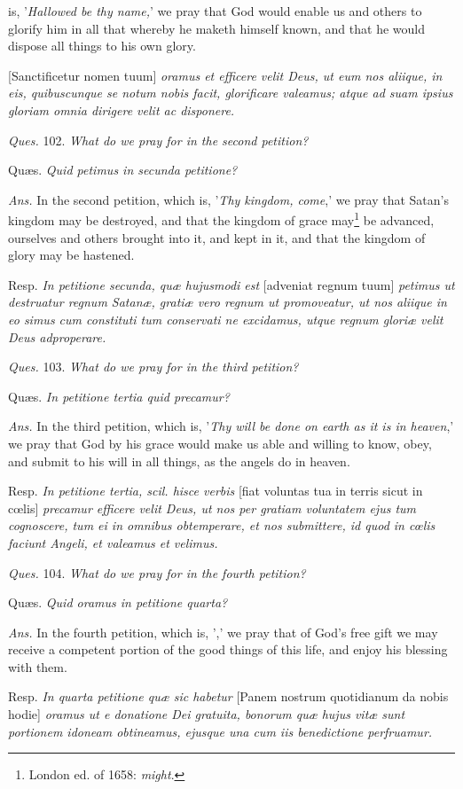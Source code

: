 is, '\emph{Hallowed be thy name,}' we pray that God would enable us and others to glorify him in all that whereby he maketh himself known, and that he would dispose all things to his own glory.

[Sanctificetur nomen tuum] \emph{oramus et efficere velit Deus, ut eum nos aliique, in eis, quibuscunque se notum nobis facit, glorificare valeamus; atque ad suam ipsius gloriam omnia dirigere velit ac disponere.}

\emph{Ques.} 102. \emph{What do we pray for in the second petition?}

Quæs. \emph{Quid petimus in secunda petitione?}

\emph{Ans.} In the second petition, which is, '\emph{Thy kingdom, come},' we pray that Satan's kingdom may be destroyed, and that the kingdom of grace may\footnote{London ed. of 1658: \emph{might}.} be advanced, ourselves and others brought into it, and kept in it, and that the kingdom of glory may be hastened.

Resp. \emph{In petitione secunda, quæ hujusmodi est} [adveniat regnum tuum] \emph{petimus ut destruatur regnum Satanæ, gratiæ vero regnum ut promoveatur, ut nos aliique in eo simus cum constituti tum conservati ne excidamus, utque regnum gloriæ velit Deus adproperare.}

\emph{Ques.} 103. \emph{What do we pray for in the third petition?}

Quæs. \emph{In petitione tertia quid precamur?}

\emph{Ans.} In the third petition, which is, '\emph{Thy will be done on earth as it is in heaven},' we pray that God by his grace would make us able and willing to know, obey, and submit to his will in all things, as the angels do in heaven.

Resp. \emph{In petitione tertia, scil. hisce verbis} [fiat voluntas tua in terris sicut in cœlis] \emph{precamur efficere velit Deus, ut nos per gratiam voluntatem ejus tum cognoscere, tum ei in omnibus obtemperare, et nos submittere, id quod in cœlis faciunt Angeli, et valeamus et velimus.}

\emph{Ques.} 104. \emph{What do we pray for in the fourth petition?}

Quæs. \emph{Quid oramus in petitione quarta?}

\emph{Ans.} In the fourth petition, which is, ',' we pray that of God's free gift we may receive a competent portion of the good things of this life, and enjoy his blessing with them.

Resp. \emph{In quarta petitione quæ sic habetur} [Panem nostrum quotidianum da nobis hodie] \emph{oramus ut e donatione Dei gratuita, bonorum quæ hujus vitæ sunt portionem idoneam obtineamus, ejusque una cum iis benedictione perfruamur.}

